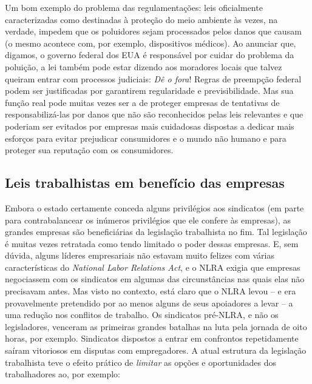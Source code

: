 Um bom exemplo do problema das regulamentações: leis oficialmente caracterizadas como destinadas à proteção do meio ambiente às vezes, na verdade, impedem que os poluidores sejam processados pelos danos que causam (o mesmo acontece com, por exemplo, dispositivos médicos). Ao anunciar que, digamos, o governo federal dos EUA é responsável por cuidar do problema da poluição, a lei também pode estar dizendo aos moradores locais que talvez queiram entrar com processos judiciais: \emph{Dê o fora}! Regras de preempção federal podem ser justificadas por garantirem regularidade e previsibilidade. Mas sua função real pode muitas vezes ser a de proteger empresas de tentativas de responsabilizá-las por danos que não são reconhecidos pelas leis relevantes e que poderiam ser evitados por empresas mais cuidadosas dispostas a dedicar mais esforços para evitar prejudicar consumidores e o mundo não humano e para proteger sua reputação com os consumidores.

\subsection*{Leis trabalhistas em benefício das empresas}

Embora o estado certamente conceda alguns privilégios aos sindicatos (em parte para contrabalancear os inúmeros privilégios que ele confere às empresas), as grandes empresas são beneficiárias da legislação trabalhista no fim. Tal legislação é muitas vezes retratada como tendo limitado o poder dessas empresas. E, sem dúvida, alguns líderes empresariais não estavam muito felizes com várias características do \emph{National Labor Relations Act}, e o NLRA exigia que empresas negociassem com os sindicatos em algumas das circunstâncias nas quais elas não precisavam antes. Mas visto no contexto, está claro que o NLRA levou -- e era provavelmente pretendido por ao menos alguns de seus apoiadores a levar -- a uma redução nos conflitos de trabalho. Os sindicatos pré-NLRA, e não os legisladores, venceram as primeiras grandes batalhas na luta pela jornada de oito horas, por exemplo. Sindicatos dispostos a entrar em confrontos repetidamente saíram vitoriosos em disputas com empregadores. A atual estrutura da legislação trabalhista teve o efeito prático de \emph{limitar} as opções e oportunidades dos trabalhadores ao, por exemplo:

